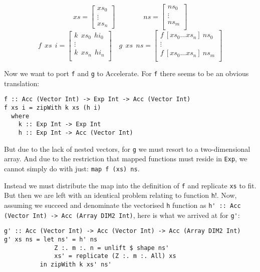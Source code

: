 \[
xs =
\begin{bmatrix}
  xs_0 \\
\vdots \\
xs_n
\end{bmatrix}
\qquad\qquad
ns =
\begin{bmatrix}
  ns_0 \\
\vdots \\
ns_m \\
\end{bmatrix}
\]
\[
f\ \ xs\ \ i =
\begin{bmatrix}
  k\ \ xs_0\ \ hi_0 \\
\vdots \\
  k\ \ xs_n\ \ hi_n \\
\end{bmatrix}
\quad
g\ \ xs\ \ ns =
\begin{bmatrix}
  f\ \left[xs_0 \ldots xs_n\right]\ ns_0 \\
\vdots \\
f\ \left[xs_0 \ldots xs_n\right]\ ns_m \\
\end{bmatrix}
\]

Now we want to port \lstinline{f} and \lstinline{g} to Accelerate.
For \lstinline{f} there seems to be an obvious translation:

\begin{verbatim}
f :: Acc (Vector Int) -> Exp Int -> Acc (Vector Int)
f xs i = zipWith k xs (h i)
  where
    k :: Exp Int -> Exp Int
    h :: Exp Int -> Acc (Vector Int)
\end{verbatim}

But due to the lack of nested vectors, for \lstinline{g} we must resort to a two-dimensional
array. And due to the restriction that mapped functions must reside in
\lstinline{Exp}, we cannot simply do with just: \verb|map f (xs) ns|.

Instead we must distribute the map into the definition of \lstinline{f} and
replicate \lstinline{xs} to fit. But then we are left with an identical problem
relating to function \lstinline{h}!. Now, assuming we succeed and denominate the
vectorised \lstinline{h} function as
\verb|h' :: Acc (Vector Int) -> Acc (Array DIM2 Int)|,
here is what we arrived at for \verb|g'|:

\begin{verbatim}
g' :: Acc (Vector Int) -> Acc (Vector Int) -> Acc (Array DIM2 Int)
g' xs ns = let ns' = h' ns
              Z :. m :. n = unlift $ shape ns'
              xs' = replicate (Z :. m :. All) xs
          in zipWith k xs' ns'
\end{verbatim}


